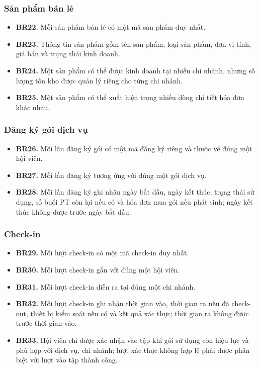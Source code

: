 \documentclass[11pt, a4paper]{article}
\begin{document}
\subsubsection{Sản phẩm bán lẻ}
\begin{itemize}
    \item \textbf{BR22.} Mỗi sản phẩm bán lẻ có một mã sản phẩm duy nhất.
    \item \textbf{BR23.} Thông tin sản phẩm gồm tên sản phẩm, loại sản phẩm, đơn vị tính, giá bán và trạng thái kinh doanh.
    \item \textbf{BR24.} Một sản phẩm có thể được kinh doanh tại nhiều chi nhánh, nhưng số lượng tồn kho được quản lý riêng cho từng chi nhánh.
    \item \textbf{BR25.} Một sản phẩm có thể xuất hiện trong nhiều dòng chi tiết hóa đơn khác nhau.
\end{itemize}

\subsubsection{Đăng ký gói dịch vụ}
\begin{itemize}
    \item \textbf{BR26.} Mỗi lần đăng ký gói có một mã đăng ký riêng và thuộc về đúng một hội viên.
    \item \textbf{BR27.} Mỗi lần đăng ký tương ứng với đúng một gói dịch vụ.
    \item \textbf{BR28.} Mỗi lần đăng ký ghi nhận ngày bắt đầu, ngày kết thúc, trạng thái sử dụng, số buổi PT còn lại nếu có và hóa đơn mua gói nếu phát sinh; ngày kết thúc không được trước ngày bắt đầu.
\end{itemize}

\subsubsection{Check-in}
\begin{itemize}
    \item \textbf{BR29.} Mỗi lượt check-in có một mã check-in duy nhất.
    \item \textbf{BR30.} Mỗi lượt check-in gắn với đúng một hội viên.
    \item \textbf{BR31.} Mỗi lượt check-in diễn ra tại đúng một chi nhánh.
    \item \textbf{BR32.} Mỗi lượt check-in ghi nhận thời gian vào, thời gian ra nếu đã check-out, thiết bị kiểm soát nếu có và kết quả xác thực; thời gian ra không được trước thời gian vào.
    \item \textbf{BR33.} Hội viên chỉ được xác nhận vào tập khi gói sử dụng còn hiệu lực và phù hợp với dịch vụ, chi nhánh; lượt xác thực không hợp lệ phải được phân biệt với lượt vào tập thành công.
\end{itemize}
\end{document}
